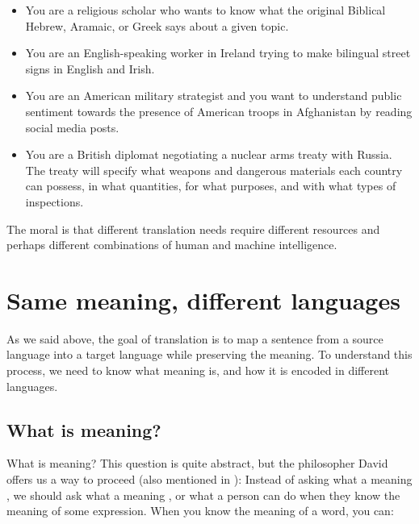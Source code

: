 \begin{itemize}
\item You are a religious scholar who wants to know what the original Biblical Hebrew, Aramaic, or Greek says about a given topic.

\item You are an English-speaking worker in Ireland trying to make bilingual street signs in English and Irish.

\item You are an American military strategist and you want to understand public sentiment towards the presence of American troops in Afghanistan by reading social media posts.

\item You are a British diplomat negotiating a nuclear arms treaty with Russia.  The treaty will specify what weapons and dangerous materials each country can possess, in what quantities, for what purposes, and with what types of inspections.

\end{itemize}

The moral is that different translation needs require different resources and perhaps different combinations of human and machine intelligence.



\section{Same meaning, different languages}

As we said above, the goal of translation is to map a sentence from a source language into a target language while preserving the meaning.  To understand this process, we need to know what meaning is, and how it is encoded in different languages.

\subsection{What is meaning?}

What is meaning?
This question is quite abstract, but the philosopher David \citet{Lewis:1972} offers us a way to proceed (also mentioned in ): Instead of asking what a meaning , we should ask what a meaning , or what a person can  do when they know the meaning of some expression.   When you know the meaning of a word, you can: 

